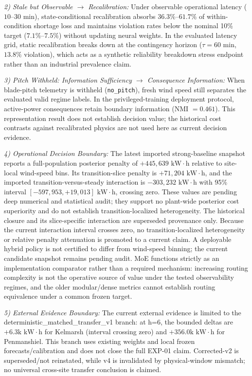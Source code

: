 \documentclass[
  journal]{IEEEtran}
\begin{document}
\textit{2) Stale but Observable $\to$ Recalibration:} Under observable
operational latency (\(10\text{--}30\text{ min}\)), state-conditional
recalibration absorbs \(36.3\%\)--\(61.7\%\) of within-condition
shortage loss and maintains violation rates below the nominal 10\%
target (\(7.1\%\text{--}7.5\%\)) without updating neural weights. In the
evaluated latency grid, static recalibration breaks down at the
contingency horizon (\(\tau = 60\text{ min}\), \(13.8\%\) violation),
which acts as a synthetic reliability breakdown stress endpoint rather
than an industrial prevalence claim.

\textit{3) Pitch Withheld: Information Sufficiency $\to$ Consequence Information:}
When blade-pitch telemetry is withheld (\texttt{no\_pitch}), fresh wind
speed still separates the evaluated valid regime labels. In the
privileged-training deployment protocol, active-power consequences
retain boundary information (NMI \(=0.461\)). This representation result
does not establish decision value; the historical cost contrasts against
recalibrated physics are not used here as current decision evidence.

\textit{4) Operational Decision Boundary:} The latest imported
strong-baseline snapshot reports a full-population posterior penalty of
\(+445{,}639\text{ kW}\cdot\text{h}\) relative to site-local wind-speed
bins. Its transition-slice penalty is
\(+71{,}204\text{ kW}\cdot\text{h}\), and the imported
transition-versus-steady interaction is
\(-303{,}232\text{ kW}\cdot\text{h}\) with 95\% interval
\([-597{,}953, +19{,}013]\text{ kW}\cdot\text{h}\), crossing zero. These
values are pending deep numerical and statistical audit; they support no
plant-wide posterior cost superiority and do not establish
transition-localized heterogeneity. The historical closure and its
slice-specific interaction are superseded provenance only. Because the
current interaction interval crosses zero, no transition-localized
heterogeneity or relative penalty attenuation is promoted to a current
claim. A deployable hybrid policy is not certified to differ from
wind-speed binning; the current candidate snapshot remains pending
audit. MoE functions strictly as an implementation comparator rather
than a required mechanism: increasing routing complexity is not the
operative source of value under the tested observability regimes, and
the older modular/dense metrics cannot establish routing equivalence
under a common frozen target.

\textit{5) External Evidence Boundary:} The current external evidence is
limited to the deterministic\_matched\_transfer\_v1 branch: at h=6, the
bounded deltas are \(+6.3\text{k kW}\cdot\text{h}\) for Kelmarsh
(interval crossing zero) and \(+356.0\text{k kW}\cdot\text{h}\) for
Penmanshiel. This branch uses existing weights and local frozen
forecasts/calibration and does not close the full EXP-01 claim.
Corrected-v2 is superseded/not reinstated, while v4 is invalidated by
physical-window mismatch; no universal cross-site transfer conclusion is
claimed.
\end{document}
